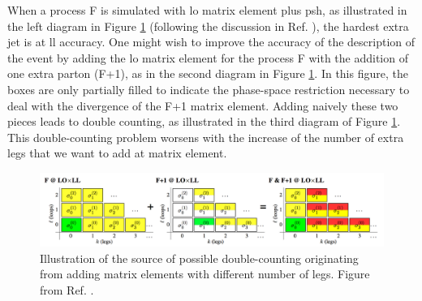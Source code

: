 When a process F is simulated with \gls{lo} matrix element plus \gls{psh}, as illustrated in the left diagram in Figure \ref{fig:sim:matching} (following the discussion in Ref. \cite{Skands:2011pf}), the hardest extra jet is at \gls{ll} accuracy. 
One might wish to improve the accuracy of the description of the event by adding the \gls{lo} matrix element for the process F with the addition of one extra parton (F+1), as in the second diagram in Figure \ref{fig:sim:matching}. In this figure, the boxes are only partially filled to indicate the phase-space restriction necessary to deal with the divergence of the F+1 matrix element. Adding naively these two pieces leads to double counting, as illustrated in the third diagram of Figure \ref{fig:sim:matching}. 
This double-counting problem worsens with the increase of the number of extra legs that we want to add at matrix element.

\begin{figure}[h]
\begin{center}
    \includegraphics[width=\textwidth]{figures/simul/matching}
\end{center}
\caption{Illustration of the source of possible double-counting originating from adding matrix elements with different number of legs. Figure from Ref. \cite{Skands:2011pf}.}
 \label{fig:sim:matching}
\end{figure}

